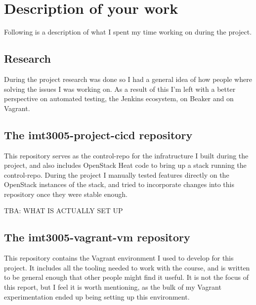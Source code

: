 

\section{Description of your work}


Following is a description of what I spent my time working on during the project.

\subsection{Research}

During the project research was done so I had a general idea of how people where solving the issues I was working on. As a result of this I'm left with a better perspective on automated testing, the Jenkins ecosystem, on Beaker and on Vagrant.

\subsection{The imt3005-project-cicd repository}

This repository serves as the control-repo for the infratructure I built during the project, and also includes OpenStack Heat code to bring up a stack running the control-repo. During the project I manually tested features directly on the OpenStack instances of the stack, and tried to incorporate changes into this repository once they were stable enough.

TBA: WHAT IS ACTUALLY SET UP

\subsection{The imt3005-vagrant-vm repository}

This repository contains the Vagrant environment I used to develop for this project. It includes all the tooling needed to work with the course, and is written to be general enough that other people might find it useful. It is not the focus of this report, but I feel it is worth mentioning, as the bulk of my Vagrant experimentation ended up being setting up this environment.

